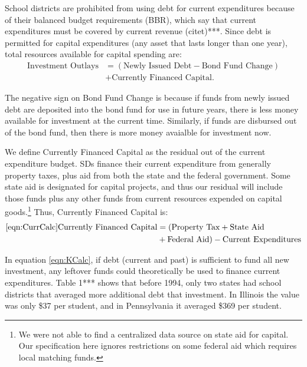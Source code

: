 School districts are prohibited from using debt for current expenditures because of their balanced budget requirements (BBR), which say that current expenditures must be covered by current revenue (citet)***.  Since debt is permitted for capital expenditures (any asset that lasts longer than one year), total resources available for capital spending are:
\begin{align}
\label{eqn:KCalc}
    \text{Investment Outlays} &= (\text{Newly Issued Debt} - \text{Bond Fund Change}) \nonumber \\
    &+ \text{Currently Financed Capital}.
\end{align}

The negative sign on Bond Fund Change is because if funds from newly issued debt are deposited into the bond fund for use in future years, there is less money available for investment at the current time.  Similarly, if funds are disbursed out of the bond fund, then there is more money avaialble for investment now.

We define Currently Financed Capital as the residual out of the current expenditure budget.  SDs finance their current expenditure from generally property taxes, plus aid from both the state and the federal government.  Some state aid is designated for capital projects, and thus our residual will include those funds plus any other funds from current resources expended on capital goods.\footnote{We were not able to find a centralized data source on state aid for capital.  Our specification here ignores restrictions on some federal aid which requires local matching funds.}  Thus, Currently Financed Capital is:
\begin{align}
\ref{eqn:CurrCalc}
    \text{Currently Financed Capital} &= (\text{Property Tax} + \text{State Aid} \nonumber \\
    &+ \text{Federal Aid}) - \text{Current Expenditures}
\end{align}

In equation \ref{eqn:KCalc}, if debt (current and past) is sufficient to fund all new investment, any leftover funds could theoretically be used to finance current expenditures.  Table 1*** shows that before 1994, only two states had school districts that averaged more additional debt that investment.  In Illinois the value was only \$37 per student, and in Pennsylvania it averaged \$369 per student.

